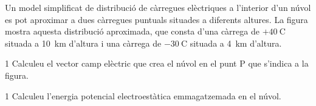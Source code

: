 Un model simplificat de distribució de càrregues elèctriques a l'interior d'un núvol es pot aproximar a dues càrregues puntuals situades a diferents altures. La figura mostra aquesta distribució aproximada, que consta d'una càrrega de $+40\ \mathrm{C}$ situada a 10~km d'altura i una càrrega de $-30\ \mathrm{C}$ situada a 4~km d'altura.


\begin{apartat}{1}
Calculeu el vector camp elèctric que crea el núvol en el punt P que s'indica a la figura.
\end{apartat}

\begin{apartat}{1}
Calculeu l'energia potencial electroestàtica emmagatzemada en el núvol.
\end{apartat}

